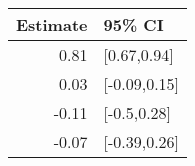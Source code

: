 \begin{tabular}{rl}
  \hline
Estimate & 95\% CI \\ 
  \hline
0.81 & [0.67,0.94] \\ 
  0.03 & [-0.09,0.15] \\ 
  -0.11 & [-0.5,0.28] \\ 
  -0.07 & [-0.39,0.26] \\ 
   \hline
\end{tabular}

